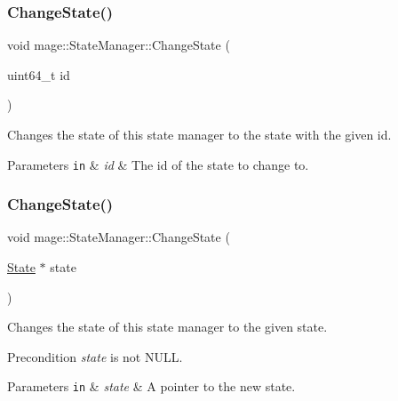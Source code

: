 \subsubsection{\texorpdfstring{Change\+State()}{ChangeState()}\hspace{0.1cm}{\footnotesize\ttfamily [1/2]}}
{\footnotesize\ttfamily void mage\+::\+State\+Manager\+::\+Change\+State (\begin{DoxyParamCaption}\item[{uint64\+\_\+t}]{id }\end{DoxyParamCaption})}

Changes the state of this state manager to the state with the given id.


\begin{DoxyParams}[1]{Parameters}
\mbox{\tt in}  & {\em id} & The id of the state to change to. \\
\hline
\end{DoxyParams}
\hypertarget{classmage_1_1_state_manager_aef491583e2e15f59aec1b98be1406fe5}{}\label{classmage_1_1_state_manager_aef491583e2e15f59aec1b98be1406fe5} 
\subsubsection{\texorpdfstring{Change\+State()}{ChangeState()}\hspace{0.1cm}{\footnotesize\ttfamily [2/2]}}
{\footnotesize\ttfamily void mage\+::\+State\+Manager\+::\+Change\+State (\begin{DoxyParamCaption}\item[{\hyperlink{classmage_1_1_state}{State} $\ast$}]{state }\end{DoxyParamCaption})\hspace{0.3cm}{\ttfamily [protected]}}

Changes the state of this state manager to the given state.

\begin{DoxyPrecond}{Precondition}
{\itshape state} is not {\ttfamily N\+U\+LL}. 
\end{DoxyPrecond}

\begin{DoxyParams}[1]{Parameters}
\mbox{\tt in}  & {\em state} & A pointer to the new state. \\
\hline
\end{DoxyParams}
\hypertarget{classmage_1_1_state_manager_ab3a37b1ef0d2e9960ff4c98747c64d3f}{}\label{classmage_1_1_state_manager_ab3a37b1ef0d2e9960ff4c98747c64d3f} 
